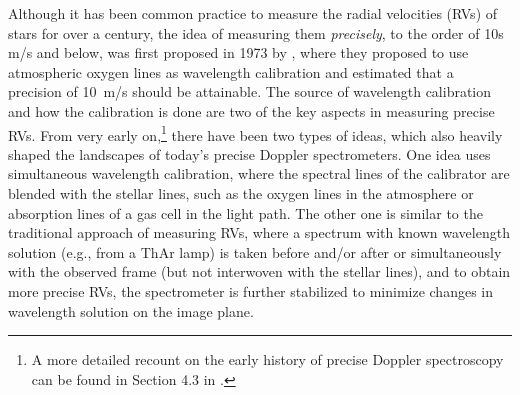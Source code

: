 Although it has been common practice to measure the radial velocities
(RVs) of stars for over a century, the idea of measuring them {\it
precisely}, to the order of 10s m/s and below, was first proposed in
1973 by \cite{1973MNRAS.162..255G}, where they proposed to use atmospheric
oxygen lines as wavelength calibration and estimated that a precision
of 10~m/s should be attainable. The source of wavelength calibration
and how the calibration is done are two of the key aspects in
measuring precise RVs. From very early on,\footnote{A more detailed
recount on the early history of precise Doppler spectroscopy can be
found in Section 4.3 in \cite{2013pss3.book..489W}.} there have been
two types of ideas, which also heavily shaped the landscapes of
today's precise Doppler spectrometers. One idea uses simultaneous
wavelength calibration, where the spectral lines of the calibrator are
blended with the stellar lines, such as the oxygen lines in the
atmosphere or absorption lines of a gas cell in the light path. The
other one is similar to the traditional approach of measuring RVs,
where a spectrum with known wavelength solution (e.g., from a ThAr
lamp) is taken before and/or after or simultaneously with the observed
frame (but not interwoven with the stellar lines), and to obtain more
precise RVs, the spectrometer is further stabilized to minimize
changes in wavelength solution on the image plane.

